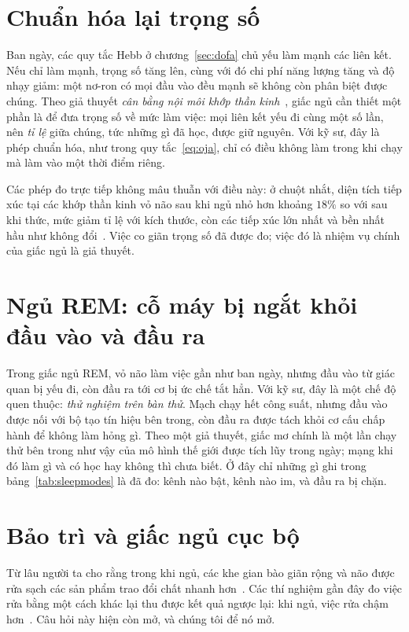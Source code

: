 \section{Chuẩn hóa lại trọng số}

Ban ngày, các quy tắc Hebb ở chương~\ref{sec:dofa} chủ yếu làm mạnh các liên kết. Nếu chỉ làm mạnh, trọng số tăng lên, cùng với đó chi phí năng lượng tăng và độ nhạy giảm: một nơ-ron có mọi đầu vào đều mạnh sẽ không còn phân biệt được chúng. Theo giả thuyết \emph{cân bằng nội môi khớp thần kinh}~\cite{TononiCirelli2014}, giấc ngủ cần thiết một phần là để đưa trọng số về mức làm việc: mọi liên kết yếu đi cùng một số lần, nên \emph{tỉ lệ} giữa chúng, tức những gì đã học, được giữ nguyên. Với kỹ sư, đây là phép chuẩn hóa, như trong quy tắc~\eqref{eq:oja}, chỉ có điều không làm trong khi chạy mà làm vào một thời điểm riêng.

Các phép đo trực tiếp không mâu thuẫn với điều này: ở chuột nhắt, diện tích tiếp xúc tại các khớp thần kinh vỏ não sau khi ngủ nhỏ hơn khoảng $18\%$ so với sau khi thức, mức giảm tỉ lệ với kích thước, còn các tiếp xúc lớn nhất và bền nhất hầu như không đổi~\cite{deVivo2017}. Việc co giãn trọng số đã được đo; việc đó là nhiệm vụ chính của giấc ngủ là giả thuyết.

\section{Ngủ REM: cỗ máy bị ngắt khỏi đầu vào và đầu ra}

Trong giấc ngủ REM, vỏ não làm việc gần như ban ngày, nhưng đầu vào từ giác quan bị yếu đi, còn đầu ra tới cơ bị ức chế tắt hẳn. Với kỹ sư, đây là một chế độ quen thuộc: \emph{thử nghiệm trên bàn thử}. Mạch chạy hết công suất, nhưng đầu vào được nối với bộ tạo tín hiệu bên trong, còn đầu ra được tách khỏi cơ cấu chấp hành để không làm hỏng gì. Theo một giả thuyết, giấc mơ chính là một lần chạy thử bên trong như vậy của mô hình thế giới được tích lũy trong ngày; mạng khi đó làm gì và có học hay không thì chưa biết. Ở đây chỉ những gì ghi trong bảng~\ref{tab:sleepmodes} là đã đo: kênh nào bật, kênh nào im, và đầu ra bị chặn.

\section{Bảo trì và giấc ngủ cục bộ}

Từ lâu người ta cho rằng trong khi ngủ, các khe gian bào giãn rộng và não được rửa sạch các sản phẩm trao đổi chất nhanh hơn~\cite{Xie2013}. Các thí nghiệm gần đây đo việc rửa bằng một cách khác lại thu được kết quả ngược lại: khi ngủ, việc rửa chậm hơn~\cite{Miao2024}. Câu hỏi này hiện còn mở, và chúng tôi để nó mở.

